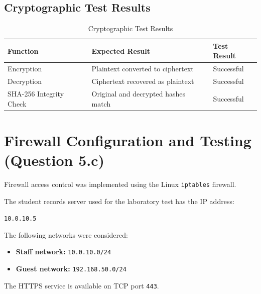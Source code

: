 \documentclass[12pt,a4paper]{article}
\begin{document}
\subsection{Cryptographic Test Results}

\begin{table}[htbp]
\centering
\caption{Cryptographic Test Results}
\begin{tabular}{p{4.5cm} p{4cm} p{4cm}}
\toprule
\textbf{Function} & \textbf{Expected Result} & \textbf{Test Result} \\
\midrule

Encryption &
Plaintext converted to ciphertext &
Successful \\

Decryption &
Ciphertext recovered as plaintext &
Successful \\

SHA-256 Integrity Check &
Original and decrypted hashes match &
Successful \\

\bottomrule
\end{tabular}
\end{table}


\newpage

\section{Firewall Configuration and Testing (Question 5.c)}

Firewall access control was implemented using the Linux \texttt{iptables} firewall.

The student records server used for the laboratory test has the IP address:

\begin{center}
\texttt{10.0.10.5}
\end{center}

The following networks were considered:

\begin{itemize}
    \item \textbf{Staff network:} \texttt{10.0.10.0/24}
    \item \textbf{Guest network:} \texttt{192.168.50.0/24}
\end{itemize}

The HTTPS service is available on TCP port \texttt{443}.
\end{document}
